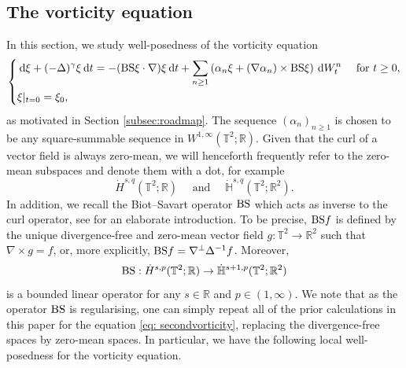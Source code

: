 \documentclass[11pt, a4paper,oneside, reqno]{amsart}
\theoremstyle{remark} %
\theoremstyle{definition} %
\numberwithin{theorem}{section}
\numberwithin{equation}{section}
\def\R{{\mathbb R}}
\newcommand{\BS}{{\rm BS}}
\newcommand{\T}{\mathbb{T}}
\newcommand{\Hs}{\mathbb{H}}
\newcommand{\del}{\Delta}
\newcommand{\grad}{\nabla}
\newcommand{\gam}{\gamma}
\newcommand{\dd}{\hspace{2pt}\mathrm{d}}
\begin{document}
\subsection{The vorticity equation}\label{subsec:vorticity}
In this section, we study well-posedness of the vorticity equation
\begin{equation}\label{eq: secondvorticity}
       \left\{
        \begin{aligned}
            &\dd \xi + (-\del)^\gam \xi \dd t  = -(\BS\xi \cdot \grad)\xi \dd t + \sum_{n \geq 1} \left(\alpha_n\xi + (\nabla \alpha_n) \times \BS\xi\right)\dd W^n_t&\text{ for }&t\geq 0,\\
            &\xi|_{t=0}=\xi_0,
        \end{aligned}
        \right.
\end{equation}
as motivated in Section \ref{subsec:roadmap}. The sequence $(\alpha_n)_{n \geq 1}$ is chosen to be any square-summable sequence in $W^{1,\infty}(\T^2;\R)$. Given that the curl of a vector field is always zero-mean, we will henceforth frequently refer to the zero-mean subspaces and denote them with a dot, for example 
\begin{equation*}
    \dot{H}^{s,q}(\T^2;\R)\quad\text{ and }\quad \dot{\Hs}^{s,q}(\T^2;\R^2).
\end{equation*}
In addition, we recall the Biot--Savart operator $\BS$ which acts as inverse to the curl operator, see \cite{bertozzi2002vorticity} for an elaborate introduction. To be precise, $\BS f$ is defined by the unique divergence-free and zero-mean vector field $g:\T^2 \rightarrow \R^2$ such that
$\nabla \times g = f$, or, more explicitly, $\BS f = \nabla^\perp \Delta^{-1}f$. 
Moreover,
\begin{equation*}
    \BS: \dot{H}^{s,p}(\T^2;\R)\to \dot{\Hs}^{s+1,p}(\T^2;\R^2)
\end{equation*}
is a bounded linear operator for any $s \in \R$ and $p\in (1,\infty)$.
 We note that as the operator $\BS$ is regularising, one can simply repeat all of the prior calculations in this paper for the equation \eqref{eq: secondvorticity}, replacing the divergence-free spaces by zero-mean spaces. In particular, we have the following local well-posedness for the vorticity equation.
\end{document}
